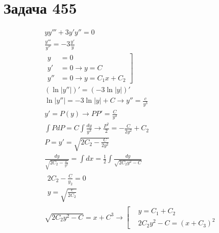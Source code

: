 \section{Задача 455}

\begin{gather}
  yy''' + 3y'y'' = 0 \\
  \frac{y'''}{y''} = -3 \frac{y'}{y} \\
  \left. \begin{aligned}
     y &= 0  \\
     y' &= 0 \rightarrow \boxed{ y = C } \\
     y'' &= 0 \rightarrow \boxed{y = C_1x+C_2}
  \end{aligned} \right] \\
  (\ln |y''|)' = (-3\ln |y|)' \\
  \ln |y''| = -3 \ln |y| + C \rightarrow y'' = \frac{c}{y^3} \\
  y' = P(y) \rightarrow PP' = \frac{C}{y^3} \\
  \int PdP = C \int \frac{dy}{y^3} \rightarrow \frac{P^2}{2} = - \frac{C}{2y^2}+ C_2 \\
  P = y' = \sqrt{2C_2 - \frac{C}{2y^2}} \\
  \frac{dy}{\sqrt{2C_2-\frac{c}{y^2}}} = \int dx = \frac{1}{2} \int \frac{dy}{\sqrt{2C_2y^2-C}} \\
  \boxed{\begin{aligned} 
    2C_2 - \frac{C}{y_2} = 0 \\
    y = \sqrt{\frac{c}{2C_2}}
  \end{aligned} } \\
  \sqrt{2C_2y^2-C} = x+C^3 \rightarrow \left[ \begin{aligned}
    &y = C_1 + C_2 \\
    &2C_2 y^2 - C = (x+C_3)^2
  \end{aligned} \right.
\end{gather}

